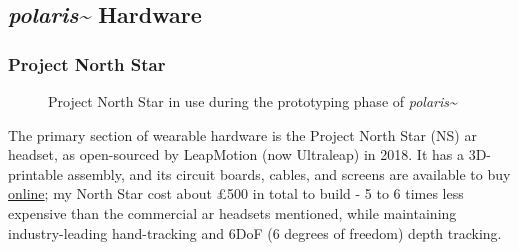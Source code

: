 \subsection{\textit{polaris\textasciitilde{}} Hardware}\label{sec: polaris-framework-hardware}
\subsubsection{Project North Star}\label{sec: polaris-framework-hardware-pns}

\begin{figure}
    \centering
    \hfill
    \caption{Project North Star in use during the prototyping phase of \textit{polaris\textasciitilde{}}}
\end{figure}

The primary section of wearable hardware is the Project North Star (NS) \gls{ar} headset, as open-sourced by LeapMotion (now Ultraleap) in 2018. It has a 3D-printable assembly, and its circuit boards, cables, and screens are available to buy \href{https://docs.projectnorthstar.org}{online}; my North Star cost about £500 in total to build - 5 to 6 times less expensive than the commercial \gls{ar} headsets mentioned, while maintaining industry-leading hand-tracking and 6DoF (6 degrees of freedom) depth tracking.

